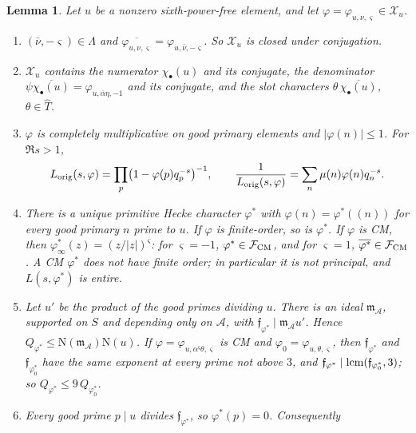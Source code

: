 \documentclass[11pt]{article}
\numberwithin{equation}{section}
\newcommand{\N}{\mathrm N}
\newtheorem{lemma}{Lemma}
\begin{document}
\begin{lemma}\label{lem:s3-labels}
Let $u$ be a nonzero sixth-power-free element, and let $\varphi=\varphi_{u,\nu,\varsigma}\in\mathcal X_u$.
\begin{enumerate}
\item[(a)] $(\bar\nu,-\varsigma)\in\Lambda$ and $\overline{\varphi_{u,\nu,\varsigma}}=\varphi_{u,\bar\nu,-\varsigma}$.
 So $\mathcal X_u$ is closed under conjugation.
\item[(b)] $\mathcal X_u$ contains the numerator $\chi_\bullet(u)$ and its conjugate, the denominator
 $\psi\overline{\chi_\bullet(u)}=\varphi_{u,\overline\alpha\eta,-1}$ and its conjugate, and the slot
 characters $\theta\,\overline{\chi_\bullet(u)}$, $\theta\in\widehat T$.
\item[(c)] $\varphi$ is completely multiplicative on good primary elements and $|\varphi(n)|\le1$. For
 $\Re s>1$,
 \begin{equation}\label{eq:d165}
 L_{\rm orig}(s,\varphi)=\prod_p\bigl(1-\varphi(p)q_p^{-s}\bigr)^{-1},\qquad
 \frac1{L_{\rm orig}(s,\varphi)}=\sum_n\mu(n)\varphi(n)q_n^{-s}.
 \end{equation}
\item[(d)] There is a unique primitive Hecke character $\varphi^*$ with $\varphi(n)=\varphi^*((n))$
 for every good primary $n$ prime to $u$. If $\varphi$ is finite-order, so is $\varphi^*$. If $\varphi$
 is CM, then $\varphi^*_\infty(z)=(z/|z|)^\varsigma$: for $\varsigma=-1$, $\varphi^*\in\mathcal F_{\rm CM}$, and
 for $\varsigma=1$, $\overline{\varphi^*}\in\mathcal F_{\rm CM}$. A CM $\varphi^*$ does not have finite
 order; in particular it is not principal, and $L(s,\varphi^*)$ is entire.
\item[(e)] Let $u'$ be the product of the good primes dividing $u$. There is an ideal
 $\mathfrak m_{\mathcal A}$, supported on $S$ and depending only on $\mathcal A$, with
 $\mathfrak f_{\varphi^*}\mid\mathfrak m_{\mathcal A}u'$. Hence
 $Q_{\varphi^*}\le\N(\mathfrak m_{\mathcal A})\N(u)$. If $\varphi=\varphi_{u,\alpha^\varsigma\theta,\varsigma}$
 is CM and $\varphi_0=\varphi_{u,\theta,\varsigma}$, then $\mathfrak f_{\varphi^*}$ and
 $\mathfrak f_{\varphi_0^*}$ have the same exponent at every prime not above $3$, and
 $\mathfrak f_{\varphi^*}\mid{\rm lcm}(\mathfrak f_{\varphi_0^*},3)$; so $Q_{\varphi^*}\le9\,Q_{\varphi_0^*}$.
\item[(f)] Every good prime $p\mid u$ divides $\mathfrak f_{\varphi^*}$, so $\varphi^*(p)=0$. Consequently
 \begin{equation}\label{eq:d166}

\end{equation}
\end{enumerate}
\end{lemma}
\end{document}
